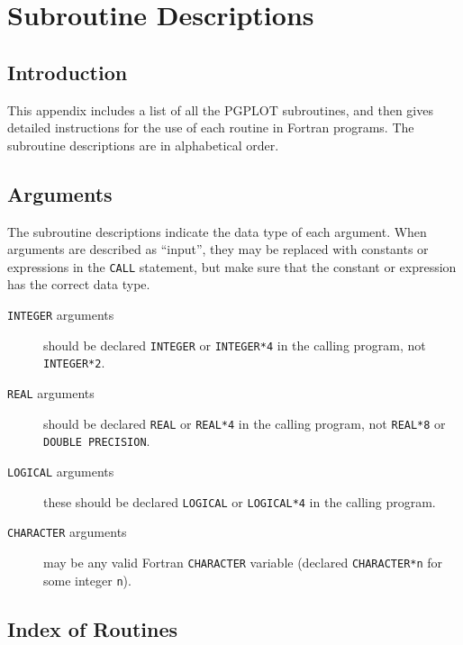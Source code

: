 \raggedbottom

\pagestyle{headings}



\appendix

\chapter{Subroutine Descriptions}

\section{Introduction}

This appendix includes a list of all the PGPLOT subroutines,
and then gives detailed instructions for the use of each routine in
Fortran programs. The subroutine descriptions are in alphabetical order.

\section{Arguments}

The subroutine descriptions indicate the data type of each
argument. When arguments are described as ``input'', they may be
replaced with constants or expressions in the {\tt CALL}
statement, but make sure that the constant or expression has the
correct data type.

\begin{description}

\item[{\tt INTEGER} arguments]
should be declared
{\tt INTEGER} or {\tt INTEGER*4} in the calling program,
not {\tt INTEGER*2}.

\item[{\tt REAL} arguments]
should be declared
{\tt REAL} or {\tt REAL*4} in the calling program, not
{\tt REAL*8} or {\tt DOUBLE PRECISION}.

\item[{\tt LOGICAL} arguments]
these should be declared
{\tt LOGICAL} or {\tt LOGICAL*4} in the calling program.

\item[{\tt CHARACTER} arguments]
may be any valid Fortran
{\tt CHARACTER} variable (declared
{\tt CHARACTER*n} for some integer {\tt n}).

\end{description}

\section{Index of Routines}


